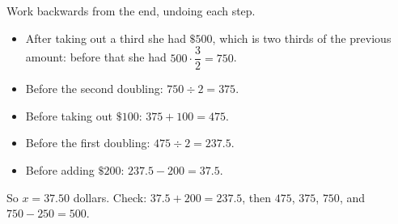 Work backwards from the end, undoing each step.
\begin{itemize}
\item After taking out a third she had $\$500$, which is two thirds of the previous amount: before that she had $500\cdot\dfrac{3}{2}=750$.
\item Before the second doubling: $750\div2=375$.
\item Before taking out $\$100$: $375+100=475$.
\item Before the first doubling: $475\div2=237.5$.
\item Before adding $\$200$: $237.5-200=37.5$.
\end{itemize}
So $x=\boxed{37.50}$ dollars. Check: $37.5+200=237.5$, then $475$, $375$, $750$, and $750-250=500$.
